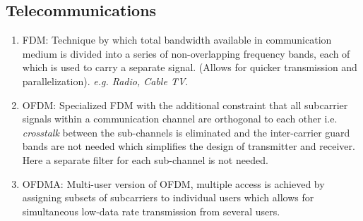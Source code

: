 \documentclass[11pt]{article}
\begin{document}
\subsection{Telecommunications}
\label{sec:org4b5cb93}
\begin{enumerate}
\item FDM: Technique by which total bandwidth available in communication medium is divided into a series of non-overlapping frequency bands, each of which is used to carry a separate signal. (Allows for quicker transmission and parallelization). \emph{e.g. Radio, Cable TV}.
\item OFDM: Specialized FDM with the additional constraint that all subcarrier signals within a communication channel are orthogonal to each other i.e. \emph{crosstalk} between the sub-channels is eliminated and the inter-carrier guard bands are not needed which simplifies the design of transmitter and receiver. Here a separate filter for each sub-channel is not needed.
\item OFDMA: Multi-user version of OFDM, multiple access is achieved by assigning subsets of subcarriers to individual users which allows for simultaneous low-data rate transmission from several users.
\end{enumerate}
\end{document}
